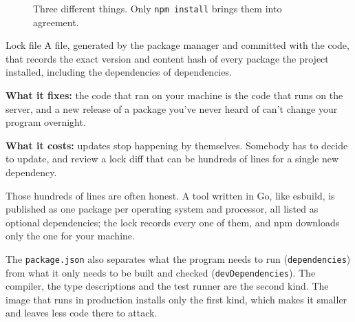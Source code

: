 \begin{figure}[htbp]
\centering
{}
\caption{Three different things. Only \texttt{npm install} brings them into
agreement.}
\end{figure}

\begin{concept}{Lock file}
A file, generated by the package manager and committed with the code, that
records the exact version and content hash of every package the project
installed, including the dependencies of dependencies.

\textbf{What it fixes:} the code that ran on your machine is the code that runs
on the server, and a new release of a package you've never heard of can't
change your program overnight.

\textbf{What it costs:} updates stop happening by themselves. Somebody has to
decide to update, and review a lock diff that can be hundreds of lines for a
single new dependency.
\end{concept}

Those hundreds of lines are often honest. A tool written in Go, like esbuild,
is published as one package per operating system and processor, all listed as
optional dependencies; the lock records every one of them, and npm downloads
only the one for your machine.

The \texttt{package.json} also separates what the program needs to run
(\texttt{dependencies}) from what it only needs to be built and checked
(\texttt{devDependencies}). The compiler, the type descriptions and the test
runner are the second kind. The image that runs in production installs only the
first kind, which makes it smaller and leaves less code there to attack.

